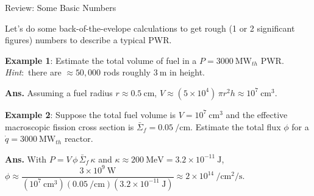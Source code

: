 \documentclass[aspectratio=1610]{beamer}
\begin{document}
\begin{frame}[fragile]{Review: Some Basic Numbers}

Let's do some back-of-the-evelope calculations to get rough (1 or 2 significant figures) numbers to describe a typical PWR. 

\pause
\vfill

{\bf Example 1}: Estimate the total volume of fuel in a $P=3000~\si{\mega\watt_{th}}$ PWR. 
{\it Hint}:~there are $\approx 50,000$ rods roughly $3~\si{\meter}$ in height.

\pause
\vfill

\textcolor{wcprimary}{ {\bf Ans.} Assuming a fuel radius $r \approx 0.5~\si{\centi\meter}$, 
$V \approx (5\times 10^4)\,\pi r^2 h \approx  10^7~\si{\centi\meter^3}$.}

\vfill
\pause

{\bf Example 2}: Suppose the total fuel volume is $V = 10^7~\si{\centi\meter^3}$ and the effective macroscopic fission cross section is 
$\bar{\Sigma}_f = 0.05~\si{\per\centi\meter}$. Estimate the total flux $\phi$ for a $\dot{q}=3000~\si{\mega\watt_{th}}$ reactor.

\vfill
\pause


\textcolor{wcprimary}{ {\bf Ans.} With $P = V\,\phi\,\bar{\Sigma}_f\,\kappa$ and $\kappa \approx 200~\si{\mega\electronvolt} = 3.2\times 10^{-11}~\si{\joule}$, 
$\phi \approx \dfrac{3\times 10^9~\si{\watt}}{(10^7~\si{\centi\meter^3})(0.05~\si{\per\centi\meter})(3.2\times 10^{-11}~\si{\joule})}
\approx 2\times 10^{14}~\si{\per\centi\meter\squared\per\second}$.}

\vfill

\end{frame}
\end{document}
